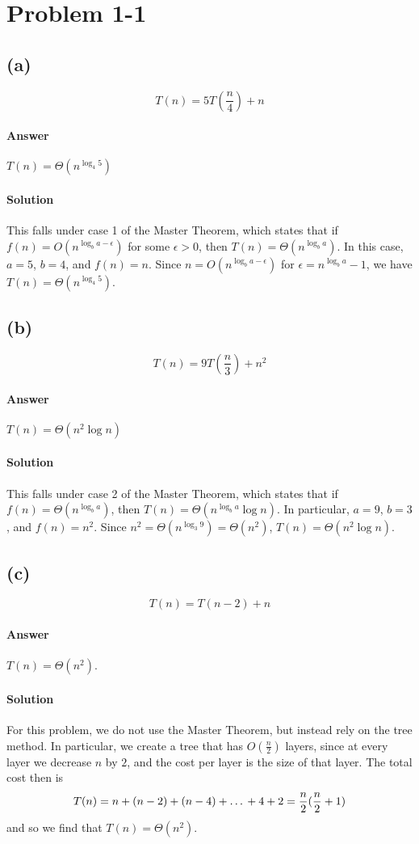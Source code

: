 \documentclass{6046}
\author{Matthew Feng, R06}
\begin{document}
\section*{Problem 1-1}
\subsection*{(a)}
$$T(n) = 5T(\frac{n}{4}) + n$$
\paragraph{Answer}
$T(n) = \Theta(n^{\log_4 5})$
\paragraph{Solution}
This falls under case 1 of the Master Theorem, which states that
if $f(n) = O(n^{\log_b a-\epsilon})$ for some $\epsilon > 0$,
then $T(n) = \Theta(n^{\log_b a})$. In this case, $a = 5$, $b = 4$,
and $f(n) = n$. Since $n = O(n^{\log_b a - \epsilon})$
for $\epsilon = n^{\log_b a} - 1$, we have $T(n) = \Theta(n^{\log_4 5})$.

\subsection*{(b)}
$$T(n) = 9T(\frac{n}{3}) + n^2$$
\paragraph{Answer}
$T(n) = \Theta(n^2\log{n})$
\paragraph{Solution}
This falls under case 2 of the Master Theorem, which states that
if $f(n) = \Theta(n^{\log_b a})$, then $T(n) = \Theta(n^{\log_ba}\log{n})$.
In particular, $a = 9$, $b = 3$, and $f(n) = n^2$.
Since $n^2 = \Theta(n^{\log_3 9}) = \Theta(n^2)$, $T(n) = \Theta(n^2\log{n})$.

\subsection*{(c)}
$$T(n) = T(n - 2) + n$$

\paragraph{Answer}
$T(n) = \Theta(n^2)$.
\paragraph{Solution}
For this problem, we do not use the Master Theorem, but instead rely on
the tree method. In particular, we create a tree that has $O(\frac{n}{2})$
layers, since at every layer we decrease $n$ by $2$, and the cost per layer
is the size of that layer. The total cost then is
$$T(n) = n + (n - 2) + (n - 4) + \text{\textellipsis} + 4 + 2 =
\frac{n}{2}(\frac{n}{2} + 1)$$
and so we find that $T(n) = \Theta(n^2)$.
\end{document}
